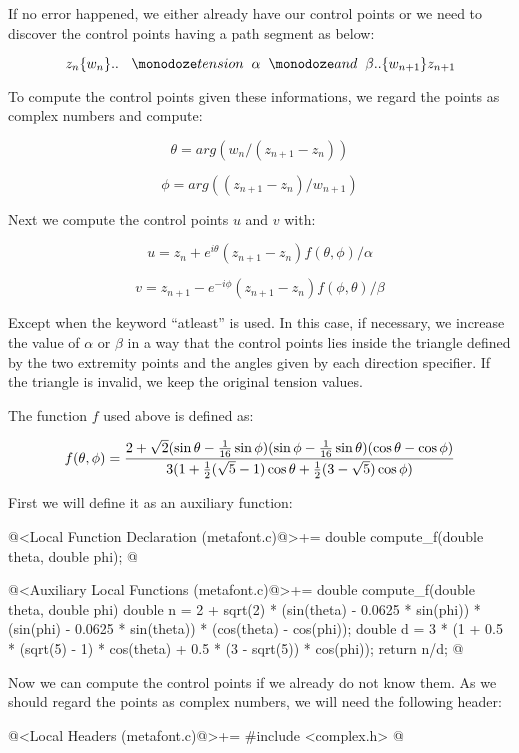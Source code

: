 If no error happened, we either already have our control points or we
need to discover the control points having a path segment as below:

$$
z_n\{w_n\}..\ {\hskip2mm \monoespaco{tension}\hskip2mm } \alpha {\hskip2mm \monoespaco{and}\hskip2mm } \beta .. \{w_{n+1}\}z_{n+1}
$$

To compute the control points given these informations, we regard the
points as complex numbers and compute:

$$
\theta = arg(w_n/(z_{n+1}-z_n))
$$

$$
\phi = arg((z_{n+1}-z_n)/w_{n+1})
$$

Next we compute the control points $u$ and $v$ with:


$$
u = z_{n} + e^{i\theta}(z_{n+1}-z_n)f(\theta, \phi)/\alpha
$$

$$
v = z_{n+1} - e^{-i\phi}(z_{n+1}-z_n)f(\phi, \theta)/\beta
$$

Except when the keyword ``atleast'' is used. In this case, if
necessary, we increase the value of $\alpha$ or $\beta$ in a way that
the control points lies inside the triangle defined by the two
extremity points and the angles given by each direction specifier. If
the triangle is invalid, we keep the original tension values.

The function $f$ used above is defined as:

$$
f(\theta, \phi) = {{2+\sqrt{2}(\sin\theta-{{1}\over{16}}\sin\phi)(\sin\phi-{{1}\over{16}}\sin\theta)(\cos\theta-\cos\phi)}\over{3(1+{1\over 2}(\sqrt 5 - 1)\cos\theta+{1\over 2}(3-\sqrt 5)\cos\phi)}}
$$

First we will define it as an auxiliary function:

\iniciocodigo
@<Local Function Declaration (metafont.c)@>+=
double compute_f(double theta, double phi);
@
\fimcodigo

\iniciocodigo
@<Auxiliary Local Functions (metafont.c)@>+=
double compute_f(double theta, double phi){
  double n = 2 + sqrt(2) * (sin(theta) - 0.0625 * sin(phi)) *
             (sin(phi) - 0.0625 * sin(theta)) * (cos(theta) - cos(phi));
  double d = 3 * (1 + 0.5 * (sqrt(5) - 1) * cos(theta) + 0.5 * (3 - sqrt(5)) *
                  cos(phi));
  return n/d;
}
@
\fimcodigo

Now we can compute the control points if we already do not know
them. As we should regard the points as complex numbers, we will need
the following header:

\iniciocodigo
@<Local Headers (metafont.c)@>+=
#include <complex.h>
@
\fimcodigo

